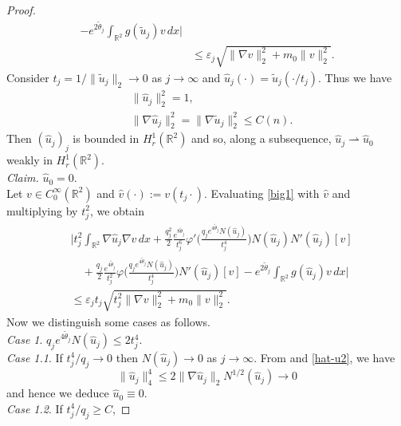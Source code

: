 \documentclass[11pt,leqno,twoside,reqno]{amsart}
\numberwithin{equation}{section}
\begin{document}
\begin{proof}
\begin{equation}
\begin{split}
-e^{2\tilde{\theta}_j}\int_{\mathbb R^{2}}g(\tilde{u}_j)v\,dx \Big|\\
&{\leqslant} \varepsilon_j\sqrt{\|\nabla v\|_2^2+m_0\|v\|_2^2}.
\end{split}
\end{equation}
Consider $t_j=1/\|\tilde{u}_j\|_2\rightarrow 0$ as $j\rightarrow\infty$ and 
$\widehat{u}_j(\cdot)=\tilde{u}_j(\cdot / t_j)$. Thus we have
\begin{align}
 & \|\widehat{u}_j\|_2^2 =1,\label{hat-u1}\\
 & \|\nabla \widehat{u}_j\|_2^2 =\|\nabla\tilde {u}_j\|_2^2{\leqslant} C(n). \label{hat-u2}
\end{align}
Then $(\widehat{u}_j)_j$ is bounded in $H_r^1(\mathbb R^2)$ and so, along
a subsequence, $\widehat{u}_j\rightharpoonup \widehat u_0$ weakly in $H_r^1(\mathbb R^2)$.\\
\textit{Claim.} $\widehat u_0=0$.\\
Let $v\in C_0^{\infty}(\mathbb R^2)$ and $\widehat v(\cdot):= v({t_j} \cdot )$. Evaluating \eqref{big1} with $\widehat v$ and multiplying by $t_j^2$, we obtain
\begin{equation}\label{big3}
\begin{split}
& \Big| t_j^2\int_{\mathbb R^{2}} \nabla \widehat{u}_j \nabla  v\,dx+
\frac{q_j^2}{2}\frac{e^{8\tilde{\theta}_j}}{t_j^6}\varphi'\Big(\frac{q_j e^{4\tilde{\theta}_j} N(\widehat{u}_j)}{t_j^{4} }\Big)
N(\widehat{u}_j) N'(\widehat{u}_j)[ v] \\
& \quad+\frac{q_j}{2}\frac{e^{4\tilde{\theta}_j}}{t_j^2}\varphi\Big(\frac{q_j e^{4\tilde{\theta}_j}N(\widehat{u}_j)}{t_j^4}\Big)
N'(\widehat{u}_j)[ v] 
-e^{2\tilde{\theta}_j}\int_{\mathbb R^{2}}g(\widehat{u}_j) v\,dx \Big|\\
&{\leqslant} \varepsilon_j t_j\sqrt{t_{j}^{2}\|\nabla v\|_2^2+m_0\| v\|_2^2}.
\end{split}
\end{equation}
Now we distinguish some cases as follows.\\
\textit{Case 1}. $q_j e^{4\tilde{\theta}_j}N(\widehat{u}_j){\leqslant} 2t_j^{4}$.\\
\textit{Case 1.1}. 
If ${t_j^{4}}/{q_j}\to 0$ then $N(\widehat{u}_j)\rightarrow 0$ as $j\rightarrow \infty$. From \cite[Proposition 2.4]{BHS} and \eqref{hat-u2}, 
we have 
\[
\|\widehat{u}_j\|_{4}^4{\leqslant} 2\|\nabla \widehat{u}_j\|_{2}N^{{1}/{2}}(\widehat{u}_j)\to 0
\]
and hence
we deduce
$\widehat u_0\equiv 0$.\\
\textit{Case 1.2}. 
If ${t_j^{4}}/{q_j}{\geqslant} C$,

\end{proof}
\end{document}
